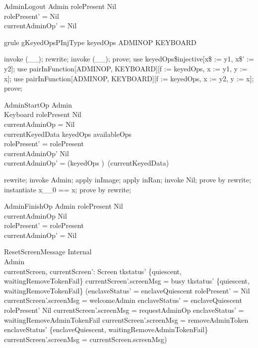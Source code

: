 \begin{schema}{AdminLogout}
  \Delta Admin
\where
  rolePresent \neq  Nil\\
  rolePresent' = Nil\\
  currentAdminOp' = Nil
\end{schema}

\begin{theorem}{grule gKeyedOpsPInjType}
keyedOps \in  ADMINOP \pinj  KEYBOARD
\end{theorem}

\begin{zproof}[gKeyedOpsPInjType]
invoke (\_\pinj \_);
rewrite;
invoke (\_\pfun \_);
prove;
use keyedOps\$injective[x\$ := y1, x\$' := y2];
use pairInFunction[ADMINOP, KEYBOARD][f := keyedOps, x := y1, y := x];
use pairInFunction[ADMINOP, KEYBOARD][f := keyedOps, x := y2, y := x];
prove;
\end{zproof}

\begin{schema}{AdminStartOp}
  \Delta Admin\\
  Keyboard
\where
  rolePresent \neq  Nil\\
  currentAdminOp = Nil\\
  currentKeyedData \in  keyedOps \limg  availableOps \rimg \\
  rolePresent' = rolePresent\\
  currentAdminOp' \neq Nil \\
  \The currentAdminOp' = (keyedOps \inv)~(currentKeyedData)
\end{schema}

\begin{zproof}
rewrite;
invoke \Delta Admin;
apply inImage;
apply inRan;
invoke Nil;
prove by rewrite;
instantiate x\_\_0 == x;
prove by rewrite;
\end{zproof}

\begin{schema}{AdminFinishOp}
  \Delta Admin
\where
  rolePresent \neq  Nil\\
  currentAdminOp \neq  Nil\\
  rolePresent' = rolePresent\\
  currentAdminOp' = Nil
\end{schema}

\begin{schema}{ResetScreenMessage}
  \Delta Internal\\
  \Delta Admin\\
  currentScreen, currentScreen': Screen
\where
  tkstatus' \notin  \{quiescent, waitingRemoveTokenFail\} \land  currentScreen'.screenMsg = busy \lor  tkstatus' \in  \{quiescent, waitingRemoveTokenFail\} \land  (enclaveStatus' = enclaveQuiescent \land  rolePresent' = Nil \land  currentScreen'.screenMsg = welcomeAdmin \lor  enclaveStatus' = enclaveQuiescent \land  rolePresent' \neq  Nil \land  currentScreen'.screenMsg = requestAdminOp \lor  enclaveStatus' = waitingRemoveAdminTokenFail \land  currentScreen'.screenMsg = removeAdminToken \lor  enclaveStatus' \notin  \{enclaveQuiescent, waitingRemoveAdminTokenFail\} \land  currentScreen'.screenMsg = currentScreen.screenMsg)
\end{schema}

